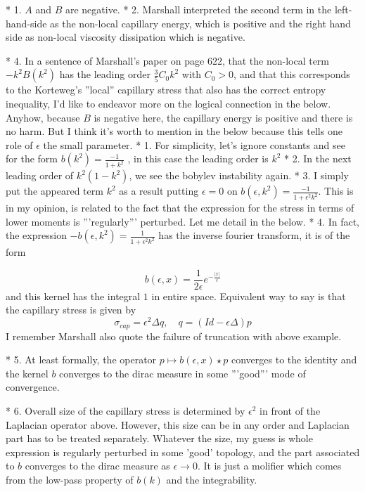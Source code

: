 \documentclass[a4paper,12pt]{article}
\begin{document}
  * 1. $A$ and $B$ are negative.
  * 2. Marshall interpreted the second term in the left-hand-side as the non-local capillary energy, which is positive and the right hand side as non-local viscosity dissipation which is negative.

 * 4. In a sentence of Marshall's paper on page 622, that the non-local term {{{$-k^2 B(k^2)$}}} has the leading order {{{$\frac{3}{5}C_0k^2$}}} with {{{$C_0>0$}}}, and that this corresponds to the Korteweg's ''local'' capillary stress that also has the correct entropy inequality, I'd like to endeavor more on the logical connection in the below. Anyhow, because $B$ is negative here, the capillary energy is positive and there is no harm. But I think it's worth to mention in the below because this tells one role of $\epsilon$ the small parameter.
  * 1. For simplicity, let's ignore constants and see for the form {{{ $b(k^2) = \frac{-1}{1+k^2}$ }}}, in this case the leading order is {{{$k^2$}}}
  * 2. In the next leading order of {{{$k^2(1-k^2)$}}}, we see the bobylev instability again.
  * 3. I simply put the appeared term {{{$k^2$}}} as a result putting $\epsilon=0$ on {{{$b(\epsilon,k^2) =  \frac{-1}{1+\epsilon^2k^2}$}}}. This is in my opinion, is related to the fact that the expression for the stress in terms of lower moments is '''regularly''' perturbed. Let me detail in the below.
  * 4. In fact, the expression {{{$-b(\epsilon,k^2) = \frac{1}{1 + \epsilon^2 k^2}$}}} has the inverse fourier transform, it is of the form

{{{$$ b(\epsilon,x) = \frac{1}{2\epsilon} e^{-\frac{|x|}{\epsilon}} $$}}} and this kernel has the integral $1$ in entire space. Equivalent way to say is  that the capillary stress is given by {{{ $$\sigma_{cap} = \epsilon^2\Delta q, \quad q = (Id - \epsilon \Delta) p$$}}} I remember Marshall also quote the failure of truncation with above example.

  * 5. At least formally, the operator $p \mapsto b(\epsilon,x)\star p$ converges to the identity and the kernel $b$ converges to the dirac measure in some '''good''' mode of convergence.

  * 6. Overall size of the capillary stress is determined by $\epsilon^2$ in front of the Laplacian operator above. However, this size can be in any order and Laplacian part has to be treated separately. Whatever the size, my guess is whole expression is regularly perturbed in some 'good' topology, and the part associated to $b$ converges to the dirac measure as $\epsilon \rightarrow 0$. It is just a molifier which comes from the low-pass property of $b(k)$ and the integrability.
\end{document}
